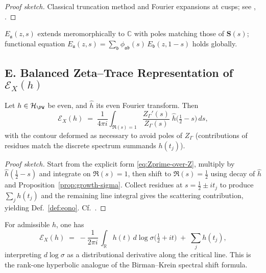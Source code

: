 \begin{proof}[Proof sketch]
Classical truncation method and Fourier expansions at cusps; see \cite[Ch.~3]{Hejhal1983II}, \cite{Iwaniec2002}.
\end{proof}

\begin{corollary}
\label{cor:eisenstein-meromorphic}
$E_{\mathfrak a}(z,s)$ extends meromorphically to $\mathbb C$ with poles matching those of $\mathbf S(s)$; functional equation
$
  E_{\mathfrak a}(z,s)=\sum_{\mathfrak b}\phi_{\mathfrak a\mathfrak b}(s)\,E_{\mathfrak b}(z,1-s)
$ holds globally.
\end{corollary}


\subsection*{E. Balanced Zeta–Trace Representation of $\mathcal E_X(h)$}
\label{subsec:balanced-zeta-trace}

\begin{theorem}
\label{thm:zeta-contour-balanced}
Let $h\in\mathcal H_{\PW}$ be even, and $\hat h$ its even Fourier transform. Then
\begin{equation}
\label{eq:balanced-contour}
  \mathcal E_X(h)
  \;=\;
  \frac{1}{4\pi i}\int_{\Re(s)=1}\frac{Z_\Gamma'(s)}{Z_\Gamma(s)}\;
  \hat h\!\Big(\tfrac12 - s\Big)\,ds,
\end{equation}
with the contour deformed as necessary to avoid poles of $Z_\Gamma$ (contributions of residues match the discrete spectrum summands $h(t_j)$).
\end{theorem}

\begin{proof}[Proof sketch]
Start from the explicit form \eqref{eq:Zprime-over-Z}, multiply by $\hat h(\tfrac12-s)$ and integrate on $\Re(s)=1$, then shift to $\Re(s)=\tfrac12$ using decay of $\hat h$ and Proposition~\ref{prop:growth-sigma}. Collect residues at $s=\tfrac12\pm it_j$ to produce $\sum_j h(t_j)$ and the remaining line integral gives the scattering contribution, yielding Def.~\ref{def:eono}. Cf.\ \cite{Selberg1956,Hejhal1983}.
\end{proof}

\begin{proposition}
\label{prop:birman-krein}
For admissible $h$, one has
\[
  \mathcal E_X(h)
  \;=\;
  -\frac{1}{2\pi i}\,\int_{\mathbb R} h(t)\,d\log\sigma\!\Big(\tfrac12+it\Big)
  \;+\; \sum_j h(t_j),
\]
interpreting $d\log\sigma$ as a distributional derivative along the critical line. This is the rank-one hyperbolic analogue of the Birman–Krein spectral shift formula.
\end{proposition}

